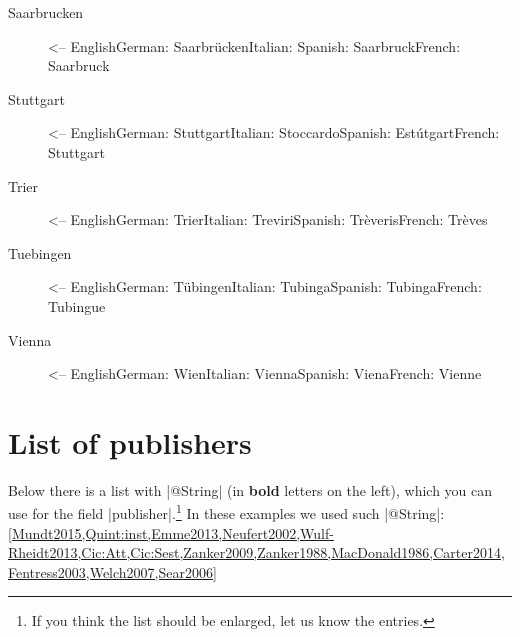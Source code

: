 \documentclass[a4paper,
10pt,
greek,
french,
spanish,
italian,
ngerman,
english
]{ltxdoc}
\begin{document}
\begin{multicols}{3}
\begin{description}
\item[Saarbrucken] <-- English\newline German: Saarbrücken\newline Italian: \newline Spanish: Saarbruck\newline French: Saarbruck
\item[Stuttgart] <-- English\newline German: Stuttgart\newline Italian: Stoccardo\newline Spanish: Estútgart\newline French: Stuttgart
\item[Trier] <-- English\newline German: Trier\newline Italian: Treviri\newline Spanish: Trèveris\newline French: Trèves
\item[Tuebingen] <-- English\newline German: Tübingen\newline Italian: Tubinga\newline Spanish: Tubinga\newline French: Tubingue
\item[Vienna] <-- English\newline German: Wien\newline Italian: Vienna\newline Spanish: Viena\newline French: Vienne
\end{description}
\end{multicols}
\section{List of publishers}\label{list-publishers}
Below there is a list with |@String| (in \textbf{bold} letters on the left), which you can use for the field |publisher|.\footnote{If you think the list should be enlarged, let us know the entries.}
In these examples we used such |@String|:
\cref{Mundt2015,Quint:inst,Emme2013,Neufert2002,Wulf-Rheidt2013,Cic:Att,Cic:Sest,Zanker2009,Zanker1988,MacDonald1986,Carter2014,Fentress2003,Welch2007,Sear2006}
\end{document}
